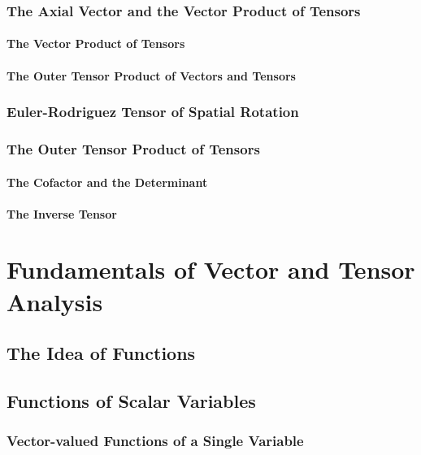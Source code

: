 \documentclass[a5paper,twosided,11pt,DIV=15,BCOR=0mm]{scrbook}
\begin{document}
\subsection{The Axial Vector and the Vector Product of Tensors}

\subsubsection{The Vector Product of Tensors}

\subsubsection{The Outer Tensor Product of Vectors and Tensors}

\subsection{Euler-Rodriguez Tensor of Spatial Rotation}

\subsection{The Outer Tensor Product of Tensors}

\subsubsection{The Cofactor and the Determinant}

\subsubsection{The Inverse Tensor}

\chapter{Fundamentals of Vector and Tensor Analysis}

\section{The Idea of Functions}

\section{Functions of Scalar Variables}

\subsection{Vector-valued Functions of a Single Variable}
\end{document}
